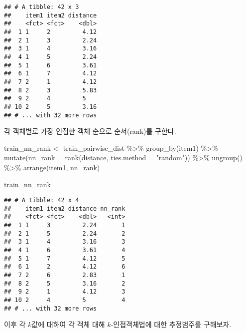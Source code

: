 \documentclass[
]{book}
\newenvironment{Shaded}{\begin{snugshade}}{\end{snugshade}}
\newcommand{\AttributeTok}[1]{\textcolor[rgb]{0.77,0.63,0.00}{#1}}
\newcommand{\FunctionTok}[1]{\textcolor[rgb]{0.00,0.00,0.00}{#1}}
\newcommand{\NormalTok}[1]{#1}
\newcommand{\OtherTok}[1]{\textcolor[rgb]{0.56,0.35,0.01}{#1}}
\newcommand{\SpecialCharTok}[1]{\textcolor[rgb]{0.00,0.00,0.00}{#1}}
\newcommand{\StringTok}[1]{\textcolor[rgb]{0.31,0.60,0.02}{#1}}
\begin{document}
\begin{verbatim}
## # A tibble: 42 x 3
##    item1 item2 distance
##    <fct> <fct>    <dbl>
##  1 1     2         4.12
##  2 1     3         2.24
##  3 1     4         3.16
##  4 1     5         2.24
##  5 1     6         3.61
##  6 1     7         4.12
##  7 2     1         4.12
##  8 2     3         5.83
##  9 2     4         5   
## 10 2     5         3.16
## # ... with 32 more rows
\end{verbatim}

각 객체별로 가장 인접한 객체 순으로 순서(rank)를 구한다.

\begin{Shaded}
\begin{Highlighting}[]
\NormalTok{train\_nn\_rank }\OtherTok{\textless{}{-}}\NormalTok{ train\_pairwise\_dist }\SpecialCharTok{\%\textgreater{}\%}
  \FunctionTok{group\_by}\NormalTok{(item1) }\SpecialCharTok{\%\textgreater{}\%}
  \FunctionTok{mutate}\NormalTok{(}\AttributeTok{nn\_rank =} \FunctionTok{rank}\NormalTok{(distance, }\AttributeTok{ties.method =} \StringTok{"random"}\NormalTok{)) }\SpecialCharTok{\%\textgreater{}\%}
  \FunctionTok{ungroup}\NormalTok{() }\SpecialCharTok{\%\textgreater{}\%}
  \FunctionTok{arrange}\NormalTok{(item1, nn\_rank)}

\NormalTok{train\_nn\_rank}
\end{Highlighting}
\end{Shaded}

\begin{verbatim}
## # A tibble: 42 x 4
##    item1 item2 distance nn_rank
##    <fct> <fct>    <dbl>   <int>
##  1 1     3         2.24       1
##  2 1     5         2.24       2
##  3 1     4         3.16       3
##  4 1     6         3.61       4
##  5 1     7         4.12       5
##  6 1     2         4.12       6
##  7 2     6         2.83       1
##  8 2     5         3.16       2
##  9 2     1         4.12       3
## 10 2     4         5          4
## # ... with 32 more rows
\end{verbatim}

이후 각 \(k\)값에 대하여 각 객체 대해 \(k\)-인접객체법에 대한 추정범주를 구해보자.
\end{document}
